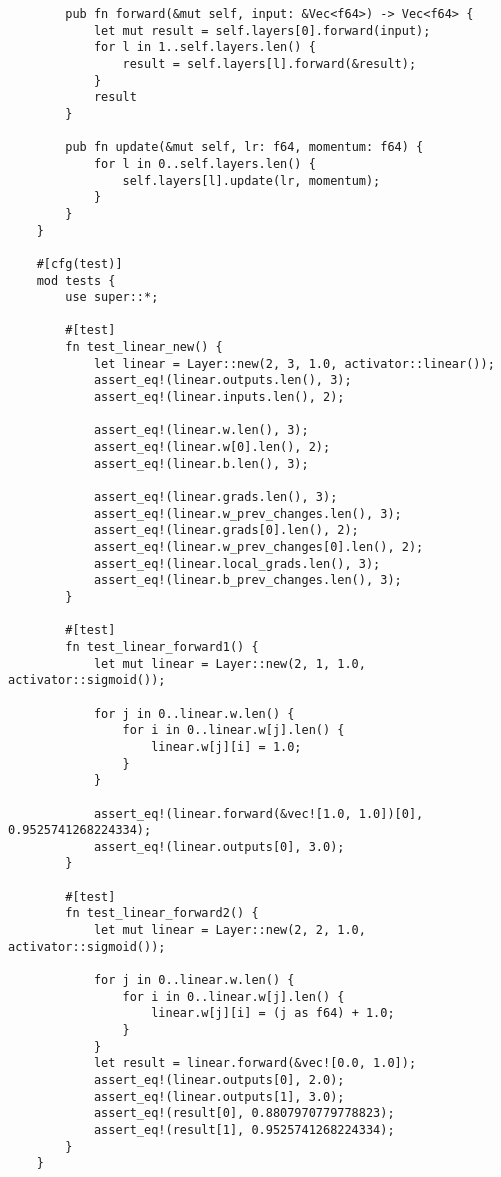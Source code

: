 \begin{verbatim}
        pub fn forward(&mut self, input: &Vec<f64>) -> Vec<f64> {
            let mut result = self.layers[0].forward(input);
            for l in 1..self.layers.len() {
                result = self.layers[l].forward(&result);
            }
            result
        }
    
        pub fn update(&mut self, lr: f64, momentum: f64) {
            for l in 0..self.layers.len() {
                self.layers[l].update(lr, momentum);
            }
        }
    }
    
    #[cfg(test)]
    mod tests {
        use super::*;
    
        #[test]
        fn test_linear_new() {
            let linear = Layer::new(2, 3, 1.0, activator::linear());
            assert_eq!(linear.outputs.len(), 3);
            assert_eq!(linear.inputs.len(), 2);
    
            assert_eq!(linear.w.len(), 3);
            assert_eq!(linear.w[0].len(), 2);
            assert_eq!(linear.b.len(), 3);
    
            assert_eq!(linear.grads.len(), 3);
            assert_eq!(linear.w_prev_changes.len(), 3);
            assert_eq!(linear.grads[0].len(), 2);
            assert_eq!(linear.w_prev_changes[0].len(), 2);
            assert_eq!(linear.local_grads.len(), 3);
            assert_eq!(linear.b_prev_changes.len(), 3);
        }
    
        #[test]
        fn test_linear_forward1() {
            let mut linear = Layer::new(2, 1, 1.0, activator::sigmoid());
    
            for j in 0..linear.w.len() {
                for i in 0..linear.w[j].len() {
                    linear.w[j][i] = 1.0;
                }
            }
    
            assert_eq!(linear.forward(&vec![1.0, 1.0])[0], 0.9525741268224334);
            assert_eq!(linear.outputs[0], 3.0);
        }
    
        #[test]
        fn test_linear_forward2() {
            let mut linear = Layer::new(2, 2, 1.0, activator::sigmoid());
    
            for j in 0..linear.w.len() {
                for i in 0..linear.w[j].len() {
                    linear.w[j][i] = (j as f64) + 1.0;
                }
            }
            let result = linear.forward(&vec![0.0, 1.0]);
            assert_eq!(linear.outputs[0], 2.0);
            assert_eq!(linear.outputs[1], 3.0);
            assert_eq!(result[0], 0.8807970779778823);
            assert_eq!(result[1], 0.9525741268224334);
        }
    }   
\end{verbatim}
